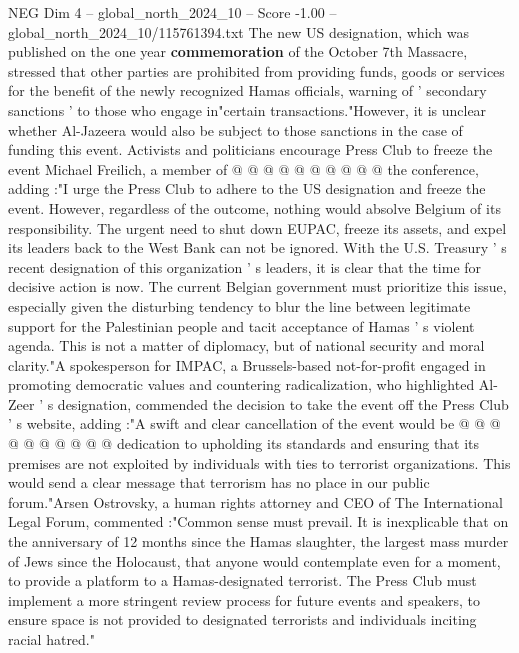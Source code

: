 \begin{textsample}{NEG Dim 4 – global\_north\_2024\_10 – Score -1.00 – global\_north\_2024\_10/115761394.txt}
The new US designation, which was published on the one year \textbf{commemoration} of the October 7th Massacre, stressed that other parties are prohibited from providing funds, goods or services for the benefit of the newly recognized Hamas officials, warning of ' secondary sanctions ' to those who engage in"certain transactions."However, it is unclear whether Al-Jazeera would also be subject to those sanctions in the case of funding this event.
Activists and politicians encourage Press Club to freeze the event Michael Freilich, a member of @ @ @ @ @ @ @ @ @ @ the conference, adding :"I urge the Press Club to adhere to the US designation and freeze the event.
However, regardless of the outcome, nothing would absolve Belgium of its responsibility.
The urgent need to shut down EUPAC, freeze its assets, and expel its leaders back to the West Bank can not be ignored.
With the U.S.
Treasury ' s recent designation of this organization ' s leaders, it is clear that the time for decisive action is now.
The current Belgian government must prioritize this issue, especially given the disturbing tendency to blur the line between legitimate support for the Palestinian people and tacit acceptance of Hamas ' s violent agenda.
This is not a matter of diplomacy, but of national security and moral clarity."A spokesperson for IMPAC, a Brussels-based not-for-profit engaged in promoting democratic values and countering radicalization, who highlighted Al-Zeer ' s designation, commended the decision to take the event off the Press Club ' s website, adding :"A swift and clear cancellation of the event would be @ @ @ @ @ @ @ @ @ @ dedication to upholding its standards and ensuring that its premises are not exploited by individuals with ties to terrorist organizations.
This would send a clear message that terrorism has no place in our public forum."Arsen Ostrovsky, a human rights attorney and CEO of The International Legal Forum, commented :"Common sense must prevail.
It is inexplicable that on the anniversary of 12 months since the Hamas slaughter, the largest mass murder of Jews since the Holocaust, that anyone would contemplate even for a moment, to provide a platform to a Hamas-designated terrorist.
The Press Club must implement a more stringent review process for future events and speakers, to ensure space is not provided to designated terrorists and individuals inciting racial hatred."

\end{textsample}
